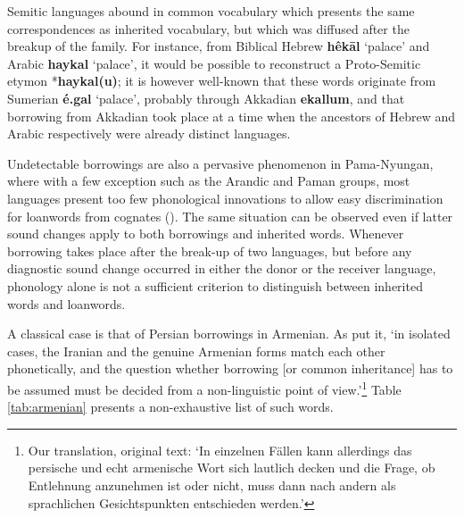 \documentclass[svgnames,12pt]{scrartcl}
\newcommand{\ipa}[1]{\textbf{{\phon\mbox{#1}}}}
\begin{document}
{{Semitic languages abound in common vocabulary which presents the same correspondences as inherited vocabulary, but which was diffused after the breakup of the family. For instance, from Biblical Hebrew \ipa{hêkāl} `palace' and Arabic \ipa{haykal} `palace', it would be possible to reconstruct a Proto-Semitic etymon *\ipa{haykal(u)}; it is however well-known that these words originate from Sumerian \ipa{é.gal} `palace', probably through Akkadian \ipa{ekallum}, and that borrowing from Akkadian took place at a time when the ancestors of Hebrew and Arabic respectively were already distinct languages.

Undetectable borrowings are also a pervasive phenomenon in Pama-Nyungan, where with a few exception such as the Arandic and Paman groups, most languages present too few phonological innovations to allow easy discrimination for loanwords from cognates (\citealt[46]{koch04method}).
The same situation can be observed even if latter sound changes apply to both borrowings and inherited words. Whenever borrowing takes place after the break-up of two languages, but before any diagnostic sound change occurred in either the donor or the receiver language, phonology alone is not a sufficient criterion to distinguish between inherited words and loanwords. 
 
A classical case is that of Persian borrowings in Armenian. As
\citet[16-17]{huebschmann97armenische} put it, `in isolated cases, the Iranian and the genuine
Armenian forms match each other phonetically, and the question whether borrowing [or common
inheritance] has to be assumed must be decided from a non-linguistic point of view.'\footnote{Our
translation, original text: `In einzelnen Fällen kann allerdings das persische und echt armenische Wort sich lautlich decken und die Frage, ob Entlehnung anzunehmen ist oder nicht, muss dann nach andern als sprachlichen Gesichtspunkten entschieden werden.'} Table \ref{tab:armenian} presents a non-exhaustive list of such words.
 
}}
\end{document}
